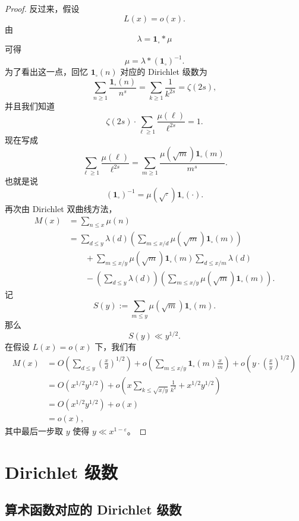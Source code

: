\begin{proof}
	反过来，假设
	\[
		L(x)=o(x).
	\]
	由
	\[
		\lambda=\mathbf 1_{\square}*\mu
	\]
	可得
	\[
		\mu=\lambda*(\mathbf 1_{\square})^{-1}.
	\]
	为了看出这一点，回忆 $\mathbf 1_{\square}(n)$ 对应的 Dirichlet 级数为
	\[
		\sum_{n\geq 1}\frac{\mathbf 1_{\square}(n)}{n^s}
		=
		\sum_{k\geq 1}\frac1{k^{2s}}
		=
		\zeta(2s),
	\]
	并且我们知道
	\[
		\zeta(2s)\cdot\sum_{\ell\geq 1}\frac{\mu(\ell)}{\ell^{2s}}=1.
	\]
	现在写成
	\[
		\sum_{\ell\geq 1}\frac{\mu(\ell)}{\ell^{2s}}
		=
		\sum_{m\geq 1}
		\frac{\mu(\sqrt m)\mathbf 1_{\square}(m)}{m^s}.
	\]
	也就是说
	\[
		(\mathbf 1_{\square})^{-1}
		=
		\mu(\sqrt{\cdot})\mathbf 1_{\square}(\cdot).
	\]
	再次由 Dirichlet 双曲线方法，
	\[
	\begin{aligned}
		M(x)
		&=\sum_{n\leq x}\mu(n)\\
		&=
		\sum_{d\leq y}\lambda(d)
		\left(\sum_{m\leq x/d}\mu(\sqrt m)\mathbf 1_{\square}(m)\right)\\
		&\qquad+
		\sum_{m\leq x/y}\mu(\sqrt m)\mathbf 1_{\square}(m)
		\sum_{d\leq x/m}\lambda(d)\\
		&\qquad-
		\left(\sum_{d\leq y}\lambda(d)\right)
		\left(\sum_{m\leq x/y}\mu(\sqrt m)\mathbf 1_{\square}(m)\right).
	\end{aligned}
	\]
	记
	\[
		S(y):=\sum_{m\leq y}\mu(\sqrt m)\mathbf 1_{\square}(m).
	\]
	那么
	\[
		S(y)\ll y^{1/2}.
	\]
	在假设 $L(x)=o(x)$ 下，我们有
	\[
	\begin{aligned}
		M(x)
		&=
		O\left(\sum_{d\leq y}\left(\frac{x}{d}\right)^{1/2}\right)
		+
		o\left(\sum_{m\leq x/y}\mathbf 1_{\square}(m)\frac{x}{m}\right)
		+
		o\left(y\cdot\left(\frac{x}{y}\right)^{1/2}\right)\\
		&=
		O(x^{1/2}y^{1/2})
		+
		o\left(x\sum_{k\leq \sqrt{x/y}}\frac1{k^2}
		+
		x^{1/2}y^{1/2}\right)\\
		&=
		O(x^{1/2}y^{1/2})+o(x)\\
		&=o(x),
	\end{aligned}
	\]
	其中最后一步取 $y$ 使得 $y\ll x^{1-\varepsilon}$。
\end{proof}

\chapter{Dirichlet 级数}
\label{chap:dirichlet-series}


\section{算术函数对应的 Dirichlet 级数}


